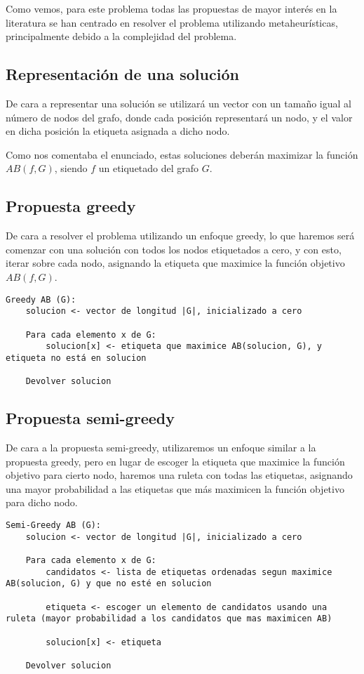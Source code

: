 Como vemos, para este problema todas las propuestas de mayor interés en la literatura se han centrado en resolver el problema utilizando metaheurísticas, principalmente debido a la complejidad del problema.

\subsection{Representación de una solución}

De cara a representar una solución se utilizará un vector con un tamaño igual al número de nodos del grafo, donde cada posición representará un nodo, y el valor en dicha posición la etiqueta asignada a dicho nodo.

Como nos comentaba el enunciado, estas soluciones deberán maximizar la función $AB(f, G)$, siendo $f$ un etiquetado del grafo $G$.

\subsection{Propuesta greedy}

De cara a resolver el problema utilizando un enfoque greedy, lo que haremos será comenzar con una solución con todos los nodos etiquetados a cero, y con esto, iterar sobre cada nodo, asignando la etiqueta que maximice la función objetivo $AB(f,G)$.

\begin{lstlisting}
Greedy AB (G):
	solucion <- vector de longitud |G|, inicializado a cero

	Para cada elemento x de G:
		solucion[x] <- etiqueta que maximice AB(solucion, G), y etiqueta no está en solucion

	Devolver solucion
\end{lstlisting}

\subsection{Propuesta semi-greedy}

De cara a la propuesta semi-greedy, utilizaremos un enfoque similar a la propuesta greedy, pero en lugar de escoger la etiqueta que maximice la función objetivo para cierto nodo, haremos una ruleta con todas las etiquetas, asignando una mayor probabilidad a las etiquetas que más maximicen la función objetivo para dicho nodo.

\begin{lstlisting}
Semi-Greedy AB (G):
	solucion <- vector de longitud |G|, inicializado a cero

	Para cada elemento x de G:
		candidatos <- lista de etiquetas ordenadas segun maximice AB(solucion, G) y que no esté en solucion

		etiqueta <- escoger un elemento de candidatos usando una ruleta (mayor probabilidad a los candidatos que mas maximicen AB)

		solucion[x] <- etiqueta

	Devolver solucion
\end{lstlisting}

